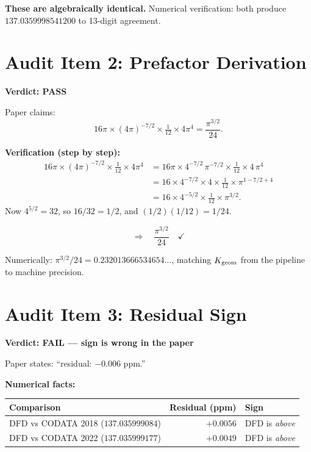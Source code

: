 \documentclass[11pt]{article}
\newcommand{\PASS}{\textcolor{pass}{\textbf{PASS}}}
\newcommand{\FAIL}{\textcolor{fail}{\textbf{FAIL}}}
\begin{document}
\textbf{These are algebraically identical.} Numerical verification:
both produce $137.0359998541200$ to 13-digit agreement.

\section{Audit Item 2: Prefactor Derivation}

\textbf{Verdict: \PASS}

\medskip
\noindent Paper claims:
\[
16\pi \times (4\pi)^{-7/2} \times \tfrac{1}{12} \times 4\pi^4
= \frac{\pi^{3/2}}{24}.
\]

\textbf{Verification (step by step):}
\begin{align}
16\pi \times (4\pi)^{-7/2} \times \tfrac{1}{12} \times 4\pi^4
&= 16\pi \times 4^{-7/2}\,\pi^{-7/2} \times \tfrac{1}{12} \times 4\,\pi^4 \\
&= 16 \times 4^{-7/2} \times 4 \times \tfrac{1}{12}
  \times \pi^{1-7/2+4} \\
&= 16 \times 4^{-5/2} \times \tfrac{1}{12} \times \pi^{3/2}.
\end{align}
Now $4^{5/2} = 32$, so $16/32 = 1/2$, and $(1/2)(1/12) = 1/24$.

\[
\Rightarrow\quad \frac{\pi^{3/2}}{24} \quad\checkmark
\]

Numerically: $\pi^{3/2}/24 = 0.232013666534654\ldots$,
matching $K_{\rm geom}$ from the pipeline to machine precision.

\section{Audit Item 3: Residual Sign}

\textbf{Verdict: \FAIL{} --- sign is wrong in the paper}

\medskip
\noindent Paper states: ``residual: $-0.006$ ppm.''

\textbf{Numerical facts:}
\begin{center}
\renewcommand{\arraystretch}{1.3}
\begin{tabular}{lrl}
\toprule
Comparison & Residual (ppm) & Sign \\
\midrule
DFD vs CODATA 2018 ($137.035999084$) & $+0.0056$ & DFD is \emph{above} \\
DFD vs CODATA 2022 ($137.035999177$) & $+0.0049$ & DFD is \emph{above} \\
\bottomrule
\end{tabular}
\end{center}
\end{document}
